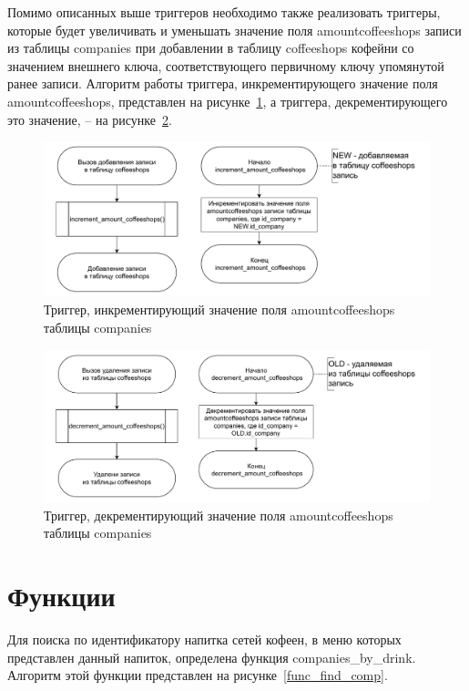 Помимо описанных выше триггеров необходимо также реализовать триггеры, которые будет увеличивать и уменьшать значение поля amountcoffeeshops записи из таблицы companies при добавлении в таблицу coffeeshops кофейни со значением внешнего ключа, соответствующего первичному ключу упомянутой ранее записи. Алгоритм работы триггера, инкрементирующего значение поля amountcoffeeshops, представлен на рисунке~\ref{increment}, а триггера, декрементирующего это значение, -- на рисунке~\ref{decrement}.

\begin{figure}[H]
	\centering
	\includegraphics[width=1\linewidth]{img/trigger_incr_amount.pdf}
	\caption{Триггер, инкрементирующий значение поля amountcoffeeshops таблицы companies}
	\label{increment}
\end{figure}


\begin{figure}[H]
	\centering
	\includegraphics[width=1\linewidth]{img/trigger_decr_amount.pdf}
	\caption{Триггер, декрементирующий значение поля amountcoffeeshops таблицы companies}
	\label{decrement}
\end{figure}

\section{Функции}
Для поиска по идентификатору напитка сетей кофеен, в меню которых представлен данный напиток, определена функция companies\_by\_drink. Алгоритм этой функции представлен на рисунке~\ref{func_find_comp}.


